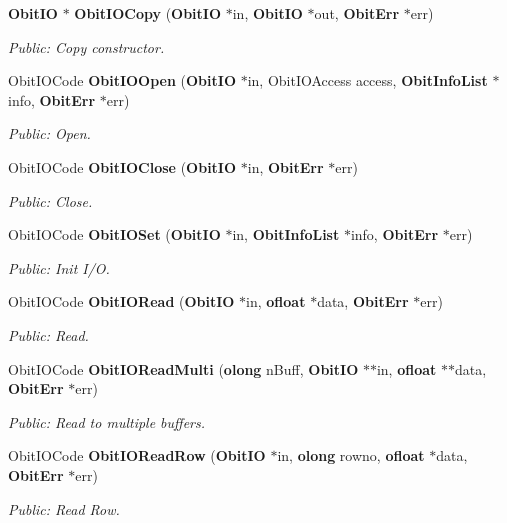 \begin{CompactItemize}
{\bf Obit\-IO} $\ast$ {\bf Obit\-IOCopy} ({\bf Obit\-IO} $\ast$in, {\bf Obit\-IO} $\ast$out, {\bf Obit\-Err} $\ast$err)
\begin{CompactList}\small\item\em Public: Copy constructor. \item\end{CompactList}\item 
Obit\-IOCode {\bf Obit\-IOOpen} ({\bf Obit\-IO} $\ast$in, Obit\-IOAccess access, {\bf Obit\-Info\-List} $\ast$info, {\bf Obit\-Err} $\ast$err)
\begin{CompactList}\small\item\em Public: Open. \item\end{CompactList}\item 
Obit\-IOCode {\bf Obit\-IOClose} ({\bf Obit\-IO} $\ast$in, {\bf Obit\-Err} $\ast$err)
\begin{CompactList}\small\item\em Public: Close. \item\end{CompactList}\item 
Obit\-IOCode {\bf Obit\-IOSet} ({\bf Obit\-IO} $\ast$in, {\bf Obit\-Info\-List} $\ast$info, {\bf Obit\-Err} $\ast$err)
\begin{CompactList}\small\item\em Public: Init I/O. \item\end{CompactList}\item 
Obit\-IOCode {\bf Obit\-IORead} ({\bf Obit\-IO} $\ast$in, {\bf ofloat} $\ast$data, {\bf Obit\-Err} $\ast$err)
\begin{CompactList}\small\item\em Public: Read. \item\end{CompactList}\item 
Obit\-IOCode {\bf Obit\-IORead\-Multi} ({\bf olong} n\-Buff, {\bf Obit\-IO} $\ast$$\ast$in, {\bf ofloat} $\ast$$\ast$data, {\bf Obit\-Err} $\ast$err)
\begin{CompactList}\small\item\em Public: Read to multiple buffers. \item\end{CompactList}\item 
Obit\-IOCode {\bf Obit\-IORead\-Row} ({\bf Obit\-IO} $\ast$in, {\bf olong} rowno, {\bf ofloat} $\ast$data, {\bf Obit\-Err} $\ast$err)
\begin{CompactList}\small\item\em Public: Read Row. \item\end{CompactList}\item 

\end{CompactItemize}
